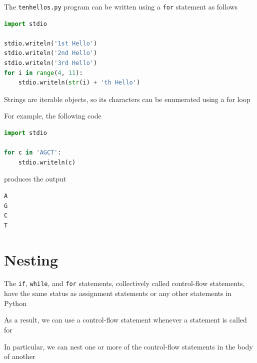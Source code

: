 \documentclass[8pt,a4paper,compress]{beamer}
\begin{document}
\begin{frame}[fragile]
\pause

The \lstinline{tenhellos.py} program can be written using a \lstinline{for} statement as follows

\smallskip

\begin{lstlisting}[language=Python,style=focusin]
import stdio

stdio.writeln('1st Hello')
stdio.writeln('2nd Hello')
stdio.writeln('3rd Hello')
for i in range(4, 11):
    stdio.writeln(str(i) + 'th Hello')
\end{lstlisting}

\pause\bigskip

Strings are iterable objects, so its characters can be enumerated using a for loop 

\pause\bigskip

For example, the following code

\smallskip

\begin{lstlisting}[language=Python,style=focusin]
import stdio

for c in 'AGCT':
    stdio.writeln(c)
\end{lstlisting}

\smallskip

produces the output

\smallskip

\begin{lstlisting}[language={},style=focusin]
A
G
C
T
\end{lstlisting}
\end{frame}

\section{Nesting}
\begin{frame}[fragile]
\pause

The \lstinline{if}, \lstinline{while}, and \lstinline{for} statements, collectively called control-flow statements, have the same status as assignment statements or any other statements in Python

\pause\bigskip

As a result, we can use a control-flow statement whenever a statement is called for

\pause\bigskip

In particular, we can nest one or more of the control-flow statements in the body of another
\end{frame}
\end{document}

